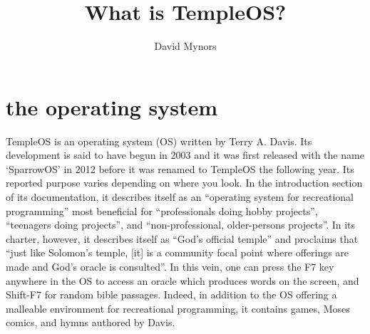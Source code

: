 \documentclass[a4paper]{article}
\author{David Mynors}
\title{What is TempleOS?}
\begin{document}
\section*{the operating system}

TempleOS is an operating system (OS) written by Terry A. Davis.
Its development is said to have begun in 2003
and it was first released with the name `SparrowOS' in 2012
before it was renamed to TempleOS the following year.
Its reported purpose varies depending on where you look.
In the introduction section of its documentation, it describes itself as
an ``operating system for recreational programming'' most beneficial for
``professionals doing hobby projects'', ``teenagers doing projects'',
and ``non-professional, older-persons projects''.
In its charter, however, it describes itself as ``God's official temple''
and proclaims that
``just like Solomon’s temple, [it] is a community focal point
where offerings are made and God’s oracle is consulted''.
In this vein, one can press the F7 key anywhere in the OS
to access an oracle which produces words on the screen,
and Shift-F7 for random bible passages.
Indeed, in addition to the OS offering
a malleable environment for recreational programming,
it contains games, Moses comics, and hymns authored by Davis.
\end{document}
